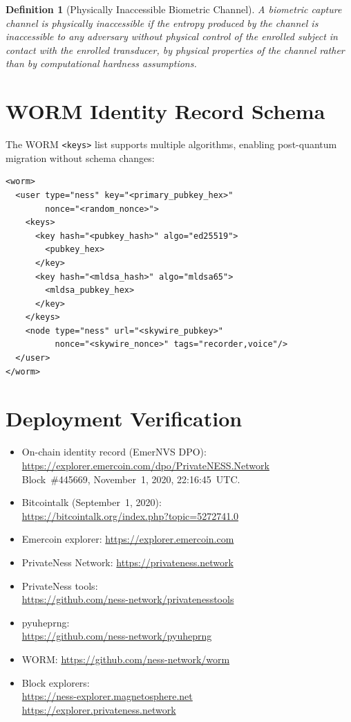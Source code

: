 \documentclass[12pt,a4paper]{article}
\newtheorem{definition}{Definition}
\begin{document}
\begin{definition}[Physically Inaccessible Biometric Channel]
\label{def:phys}
A biometric capture channel is \emph{physically inaccessible} if the
entropy produced by the channel is inaccessible to any adversary without
physical control of the enrolled subject in contact with the enrolled
transducer, by physical properties of the channel rather than by
computational hardness assumptions.
\end{definition}

\section{WORM Identity Record Schema}

The WORM \texttt{<keys>} list supports multiple algorithms, enabling
post-quantum migration without schema changes:

\begin{verbatim}
<worm>
  <user type="ness" key="<primary_pubkey_hex>"
        nonce="<random_nonce>">
    <keys>
      <key hash="<pubkey_hash>" algo="ed25519">
        <pubkey_hex>
      </key>
      <key hash="<mldsa_hash>" algo="mldsa65">
        <mldsa_pubkey_hex>
      </key>
    </keys>
    <node type="ness" url="<skywire_pubkey>"
          nonce="<skywire_nonce>" tags="recorder,voice"/>
  </user>
</worm>
\end{verbatim}

\section{Deployment Verification}

\begin{itemize}
  \item On-chain identity record (EmerNVS DPO):\\
        \url{https://explorer.emercoin.com/dpo/PrivateNESS.Network}\\
        Block~\#445669, November~1, 2020, 22:16:45~UTC.
  \item Bitcointalk (September~1, 2020):\\
        \url{https://bitcointalk.org/index.php?topic=5272741.0}
  \item Emercoin explorer: \url{https://explorer.emercoin.com}
  \item PrivateNess Network: \url{https://privateness.network}
  \item PrivateNess tools:\\
        \url{https://github.com/ness-network/privatenesstools}
  \item pyuheprng:\\
        \url{https://github.com/ness-network/pyuheprng}
  \item WORM: \url{https://github.com/ness-network/worm}
  \item Block explorers:\\
        \url{https://ness-explorer.magnetosphere.net}\\
        \url{https://explorer.privateness.network}
\end{itemize}
\end{document}

